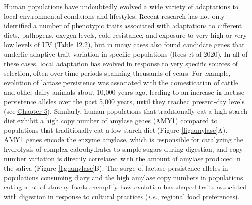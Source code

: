 \documentclass[
]{book}
\begin{document}
Human populations have undoubtedly evolved a wide variety of adaptations to local environmental conditions and lifestyles. Recent research has not only identified a number of phenotypic traits associated with adaptations to different diets, pathogens, oxygen levels, cold resistance, and exposure to very high or very low levels of UV (Table 12.2), but in many cases also found candidate genes that underlie adaptive trait variation in specific populations (Rees et al 2020). In all of these cases, local adaptation has evolved in response to very specific sources of selection, often over time periods spanning thousands of years. For example, evolution of lactase persistence was associated with the domestication of cattle and other dairy animals about 10,000 years ago, leading to an increase in lactase persistence alleles over the past 5,000 years, until they reached present-day levels (see \href{evolutionary-mechanisms-i-modeling-selection.html\#fig:lactase}{Chapter 5}). Similarly, human populations that traditionally eat a high-starch diet exhibit a high copy number of amylase genes (AMY1) compared to populations that traditionally eat a low-starch diet (Figure \ref{fig:amylase}A). AMY1 genes encode the enzyme amylase, which is responsible for catalyzing the hydrolysis of complex cabrohydrates to simple sugars during digestion, and copy number variation is directly correlated with the amount of amylase produced in the saliva (Figure \ref{fig:amylase}B). The surge of lactase persistence alleles in populations consuming diary and the high amylase copy numbers in populations eating a lot of starchy foods exemplify how evolution has shaped traits associated with digestion in response to cultural practices (\emph{i.e.}, regional food preferences).
\end{document}
